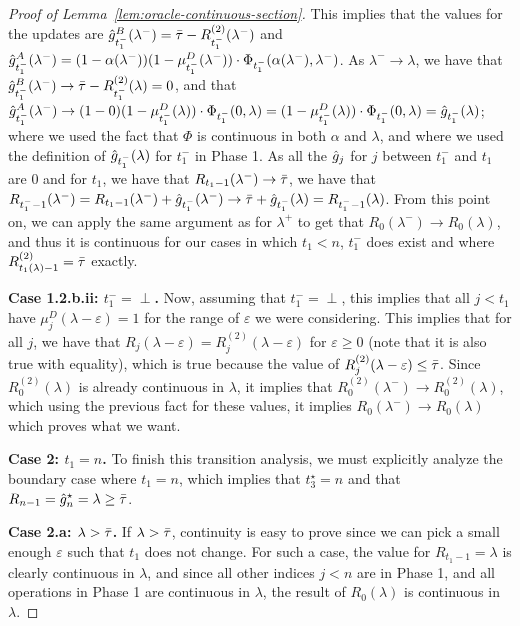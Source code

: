 \begin{proof}[Proof of Lemma~\ref{lem:oracle-continuous-section}]
    This implies that the values for the updates are $\hat{g}_{{t_1^-}}^B(\lambda^-) = \bar\tau - R_{{t_1^-}}^{(2)}(\lambda^-)$ and $\hat{g}_{{t_1^-}}^A (\lambda^-)= (1 - \alpha(\lambda^-))(1 - \mu_{{t_1^-}}^D(\lambda^-)) \cdot \Phi_{{t_1^-}}(\alpha(\lambda^-),\lambda^-)$. As $\lambda^-\to\lambda$, we have that $\hat{g}_{{t_1^-}}^B(\lambda^-)\to \bar\tau - R_{{t_1^-}}^{(2)}(\lambda)=0$, and that $\hat{g}_{{t_1^-}}^A (\lambda^-)\to (1 - 0)(1 - \mu_{{t_1^-}}^D(\lambda)) \cdot \Phi_{{t_1^-}}(0,\lambda)=(1 - \mu_{{t_1^-}}^D(\lambda)) \cdot \Phi_{{t_1^-}}(0,\lambda)=\hat{g}_{t_1^-}(\lambda)$; where we used the fact that $\Phi$ is continuous in both $\alpha$ and $\lambda$, and where we used the definition of $\hat{g}_{t_1^-}(\lambda)$ for $t_1^-$ in Phase 1. As all the $\hat{g}_j$ for $j$ between $t_1^-$ and $t_1$ are $0$ and for $t_1$, we have that $R_{t_1-1}(\lambda^-)\to\bar\tau$, we have that $R_{t_1^- -1}(\lambda^-) = R_{t_1-1}(\lambda^-) + \hat{g}_{t_1^-}(\lambda^-) \to \bar\tau + \hat{g}_{t_1^-}(\lambda) = R_{t_1^- -1}(\lambda)$. From this point on, we can apply the same argument as for $\lambda^+$ to get that $R_0(\lambda^-)\to R_0(\lambda)$, and thus it is continuous for our cases in which $t_1<n$, $t_1^-$ does exist and where $R_{t_1(\lambda)-1}^{(2)}=\bar\tau$ exactly.

    \smallskip
    \noindent\textbf{Case 1.2.b.ii: $t_1^-=\perp$.}
    Now, assuming that $t_1^-=\perp$, this implies that all $j<t_1$ have $\mu_j^D(\lambda-\varepsilon)=1$ for the range of $\varepsilon$ we were considering. This implies that for all $j$, we have that $R_j(\lambda-\varepsilon)=R_j^{(2)}(\lambda-\varepsilon)$ for $\varepsilon\geq 0$ (note that it is also true with equality), which is true because the value of $R_j^{(2)}(\lambda-\varepsilon)\leq \bar\tau$. Since $R_0^{(2)}(\lambda)$ is already continuous in $\lambda$, it implies that $R_0^{(2)}(\lambda^-)\to R_0^{(2)}(\lambda)$, which using the previous fact for these values, it implies $R_0(\lambda^-)\to R_0(\lambda)$ which proves what we want.

    \smallskip
    \noindent\textbf{Case 2: $t_1=n$.}
    To finish this transition analysis, we must explicitly analyze the boundary case where $t_1 = n$, which implies that $t_3^\star=n$ and that $R_{n-1}=\hat{g}_n^\star=\lambda\geq \bar\tau$.

    \smallskip
    \noindent\textbf{Case 2.a: $\lambda>\bar\tau$.}
    If $\lambda > \bar\tau$, continuity is easy to prove since we can pick a small enough $\varepsilon$ such that $t_1$ does not change. For such a case, the value for $R_{t_1-1}=\lambda$ is clearly continuous in $\lambda$, and since all other indices $j<n$ are in Phase 1, and all operations in Phase 1 are continuous in $\lambda$, the result of $R_0(\lambda)$ is continuous in $\lambda$.


\end{proof}
